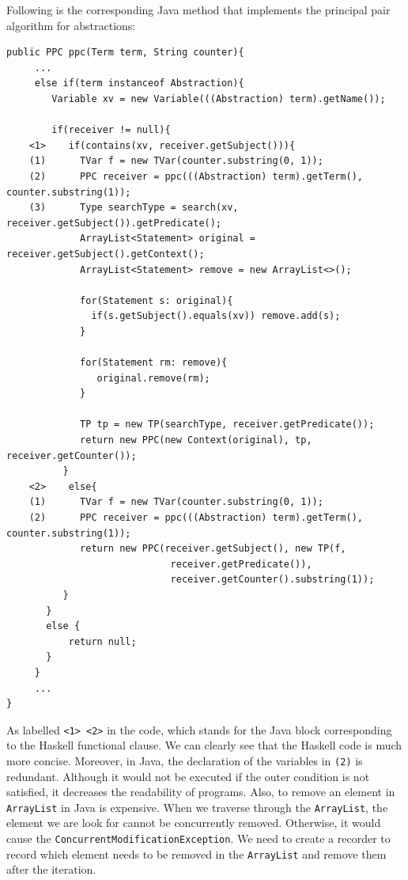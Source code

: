 Following is the corresponding Java method that implements the principal pair algorithm for abstractions:

\begin{verbatim}
public PPC ppc(Term term, String counter){
     ...
     else if(term instanceof Abstraction){
        Variable xv = new Variable(((Abstraction) term).getName());
    
        if(receiver != null){
    <1>    if(contains(xv, receiver.getSubject())){
    (1)      TVar f = new TVar(counter.substring(0, 1));
    (2)      PPC receiver = ppc(((Abstraction) term).getTerm(), counter.substring(1));
    (3)      Type searchType = search(xv, receiver.getSubject()).getPredicate();
             ArrayList<Statement> original = receiver.getSubject().getContext();
             ArrayList<Statement> remove = new ArrayList<>();

             for(Statement s: original){
               if(s.getSubject().equals(xv)) remove.add(s);
             }

             for(Statement rm: remove){
                original.remove(rm);
             }

             TP tp = new TP(searchType, receiver.getPredicate());
             return new PPC(new Context(original), tp, receiver.getCounter());
          }
    <2>    else{
    (1)      TVar f = new TVar(counter.substring(0, 1));
    (2)      PPC receiver = ppc(((Abstraction) term).getTerm(), counter.substring(1));
             return new PPC(receiver.getSubject(), new TP(f, 
                             receiver.getPredicate()),
                             receiver.getCounter().substring(1));
          }
       }
       else {
           return null;
       }
     }
     ...
}
\end{verbatim}

As labelled \verb|<1> <2>| in the code, which stands for the Java block corresponding to the Haskell functional clause. We can clearly see that the Haskell code is much more concise. Moreover, in Java, the declaration of the variables in \texttt{(2)} is redundant. Although it would not be executed if the outer condition is not satisfied, it decreases the readability of programs. Also, to remove an element in \verb|ArrayList| in Java is expensive. When we traverse through the \verb|ArrayList|, the element we are look for cannot be concurrently removed. Otherwise, it would cause the \verb|ConcurrentModificationException|. We need to create a recorder to record which element needs to be removed in the \verb|ArrayList| and remove them after the iteration.  

